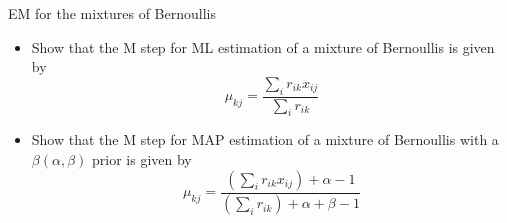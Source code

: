 \documentclass[a4paper,twoside=false,abstract=false,numbers=noenddot,
titlepage=false,headings=small,parskip=half,version=last]{scrartcl}
\begin{document}
\begin{exercise}{11.3} EM for the mixtures of Bernoullis\\ 
    \begin{itemize}
        \item Show that the M step for ML estimation of a mixture of Bernoullis
            is given by
            \begin{equation}
                \label{eq:EM_ML_Ber}
                \mu_{kj} = 
                \frac
                {
                    \sum_i{
                        r_{ik}x_{ij}
                    }
                }
                {
                \sum_i{
                    r_{ik}
                }
            } 
            \end{equation}
        \item Show that the M step for MAP estimation of a mixture of
        Bernoullis with a $\beta(\alpha,\beta)$ prior is given by
            \begin{equation}
                \label{eq:EM_MAP_Ber}
                \mu_{kj} = 
                \frac
                {
                    (\sum_i{
                        r_{ik}x_{ij}
                    }) + \alpha - 1
                }
                {
                    (\sum_i{
                        r_{ik}
                    }) + \alpha + \beta - 1
                }
            \end{equation}
    \end{itemize}
\end{exercise}
\end{document}
